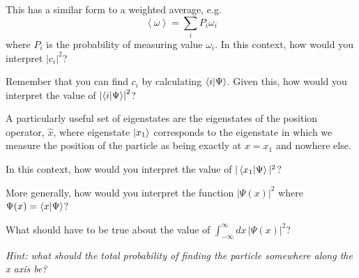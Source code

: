	\begin{questions}
	
		\question This has a similar form to a weighted average, e.g.
			\begin{equation*}
				\left\langle \omega \right\rangle = \sum_i P_i \omega_i
			\end{equation*}
			where $P_i$ is the probability of measuring value $\omega_i$. 
			In this context, how would you interpret $|c_i|^2$?
			
			\begin{solution}[1in]
			\end{solution}
			
		\question Remember that you can find $c_i$ by calculating $\braket{i|\Psi}$. Given this, how would you interpret the value of $\left|\braket{i|\Psi}\right|^2$?
			
			\begin{solution}[1in]
			\end{solution}
		
		\question A particularly useful set of eigenstates are the eigenstates of the position operator, $\hat x$, where eigenstate $\ket{x_1}$ corresponds to the eigenstate in which we measure the position of the particle as being exactly at $x=x_1$ and nowhere else.
		
			In this context, how would you interpret the value of $|\braket{x_1|\Psi}|^2$?
			
			\begin{solution}[1.75in]
			\end{solution}
			\contdnewpg
		
		\newpage
		\question More generally, how would you interpret the function $|\Psi(x)|^2$ where $\Psi(x) = \braket{x|\Psi}$?
		
			\begin{solution}[2in]
			\end{solution}
			
		\question What should have to be true about the value of $\int_{-\infty}^{\infty} dx\, |\Psi(x)|^2$?
		
			\emph{Hint: what should the total probability of finding the particle \emph{somewhere} along the x axis be?}
		
			\begin{solution}[5.75in]
			\end{solution}
		
	\end{questions}
	
\stophere